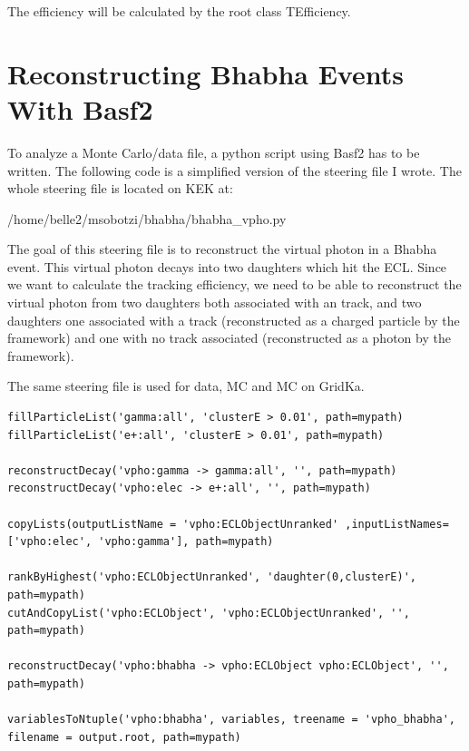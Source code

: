 \documentclass[a4paper,11pt,twosided,final,german,openbib,pdftex,listof=totoc,bibliography=totoc]{scrbook}
\begin{document}
The efficiency will be calculated by the root class TEfficiency. 



\section{Reconstructing Bhabha Events With Basf2}
\label{sec:RecBasf2}


To analyze a Monte Carlo/data file, a python script using Basf2 has to be written. The following code is a simplified version of the steering file I wrote. 
The whole steering file is located on KEK at:
\newline 

/home/belle2/msobotzi/bhabha/bhabha\_vpho.py
\newline


The goal of this steering file is to reconstruct the virtual photon in a Bhabha event. This virtual photon decays into two daughters which hit the ECL. Since we want to calculate the tracking efficiency, we need to be able to reconstruct the virtual photon from two daughters both associated with an track, and two daughters one associated with a track (reconstructed as a charged particle by the framework) and one with no track associated (reconstructed as a photon by the framework).

The same steering file is used for data, MC and MC on GridKa. 
\newline 





{\small
\begin{lstlisting}
fillParticleList('gamma:all', 'clusterE > 0.01', path=mypath)
fillParticleList('e+:all', 'clusterE > 0.01', path=mypath)

reconstructDecay('vpho:gamma -> gamma:all', '', path=mypath)
reconstructDecay('vpho:elec -> e+:all', '', path=mypath)

copyLists(outputListName = 'vpho:ECLObjectUnranked' ,inputListNames=['vpho:elec', 'vpho:gamma'], path=mypath)

rankByHighest('vpho:ECLObjectUnranked', 'daughter(0,clusterE)', path=mypath)
cutAndCopyList('vpho:ECLObject', 'vpho:ECLObjectUnranked', '', path=mypath)
	
reconstructDecay('vpho:bhabha -> vpho:ECLObject vpho:ECLObject', '', path=mypath)

variablesToNtuple('vpho:bhabha', variables, treename = 'vpho_bhabha', filename = output.root, path=mypath)
	
\end{lstlisting}
}
\bigskip
\end{document}
